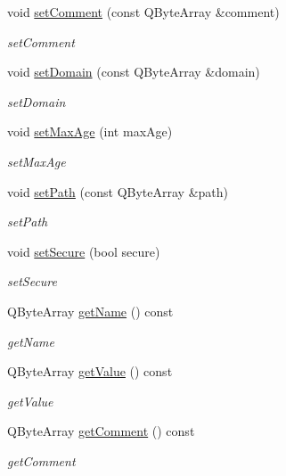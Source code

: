 \begin{DoxyCompactItemize}
void \hyperlink{class_http_cookie_a77e86a49664f147dc359cb9ad8a9013b}{set\+Comment} (const Q\+Byte\+Array \&comment)
\begin{DoxyCompactList}\small\item\em set\+Comment \end{DoxyCompactList}\item 
void \hyperlink{class_http_cookie_ae4bd49d769fb962399fa1692fe30c8f1}{set\+Domain} (const Q\+Byte\+Array \&domain)
\begin{DoxyCompactList}\small\item\em set\+Domain \end{DoxyCompactList}\item 
void \hyperlink{class_http_cookie_a4bee3fe68608752f1bea204a3a6b5134}{set\+Max\+Age} (int max\+Age)
\begin{DoxyCompactList}\small\item\em set\+Max\+Age \end{DoxyCompactList}\item 
void \hyperlink{class_http_cookie_ae302154143022f4bb213afc569df8dd5}{set\+Path} (const Q\+Byte\+Array \&path)
\begin{DoxyCompactList}\small\item\em set\+Path \end{DoxyCompactList}\item 
void \hyperlink{class_http_cookie_ab96aa1b1dd995c05fc0e092e1fb7b1e3}{set\+Secure} (bool secure)
\begin{DoxyCompactList}\small\item\em set\+Secure \end{DoxyCompactList}\item 
Q\+Byte\+Array \hyperlink{class_http_cookie_abecd0373e90e3701e82bb4dc630c54a7}{get\+Name} () const
\begin{DoxyCompactList}\small\item\em get\+Name \end{DoxyCompactList}\item 
Q\+Byte\+Array \hyperlink{class_http_cookie_a04d3cdafe9c7e5f9068816abf33aa4a9}{get\+Value} () const
\begin{DoxyCompactList}\small\item\em get\+Value \end{DoxyCompactList}\item 
Q\+Byte\+Array \hyperlink{class_http_cookie_ad48e447c1d4dfbed9e81713016ca0531}{get\+Comment} () const
\begin{DoxyCompactList}\small\item\em get\+Comment \end{DoxyCompactList}\item 

\end{DoxyCompactItemize}
